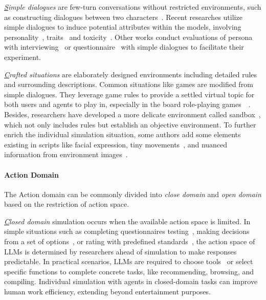 \textit{{\ul Simple dialogues}} are few-turn conversations without restricted environments, such as constructing dialogues between two characters~\cite{brahman2021letcharacterstellstory}. Recent researches utilize simple dialogues to induce potential attributes within the models, involving personality~\cite{karra2023estimatingpersonalitywhiteboxlanguage,jiang2023evaluatinginducingpersonalitypretrained}, traits~\cite{serapiogarcía2023personalitytraitslargelanguage} and toxicity~\cite{deshpande2023toxicitychatgptanalyzingpersonaassigned}. Other works conduct evaluations of persona with interviewing~\cite{wang2024incharacterevaluatingpersonalityfidelity} or questionnaire~\cite{pan2023llmspossesspersonalitymaking} with simple dialogues to facilitate their experiment.

\textit{{\ul Crafted situations}} are elaborately designed environments including detailed rules and surrounding descriptions. Common situations like games are modified from simple dialogues. They leverage game rules to provide a settled virtual topic for both users and agents to play in, especially in the board role-playing games~\cite{light2023avalonbenchevaluatingllmsplaying,light2023avalonbenchevaluatingllmsplaying}~\cite{chalamalasetti2023clembenchusinggameplay}. Besides, researchers have developed a more delicate environment called sandbox~\cite{chen2024socialbenchsocialityevaluationroleplaying}, which not only includes rules but establish an objective environment. To further enrich the individual simulation situation, some authors add some elements existing in scripts like facial expression, tiny movements~\cite{agrawal-etal-2023-multimodal,wu2024roleplaydramainteractionllmsolution}, and nuanced information from environment images~\cite{dai2024mmrolecomprehensiveframeworkdeveloping}.

\paragraph{Action Domain} The Action domain can be commonly divided into \textit{close domain} and \textit{open domain} based on the restriction of action space.

\textit{{\ul Closed domain}} simulation occurs when the available action space is limited. In simple situations such as completing questionnaires testing~\cite{karra2023estimatingpersonalitywhiteboxlanguage}, making decisions from a set of options~\cite{horton2023largelanguagemodelssimulated}, or rating with predefined standards~\cite{wang2024incharacterevaluatingpersonalityfidelity}, the action space of LLMs is determined by researchers ahead of simulation to make responses predictable. In practical scenarios, LLMs are required to choose tools~\cite{chen2023chatcottoolaugmentedchainofthoughtreasoning,yuan2023skill} or select specific functions to complete concrete tasks, like recommending, browsing, and compiling.
Individual simulation with agents in closed-domain tasks can improve human work efficiency, extending beyond entertainment purposes.

